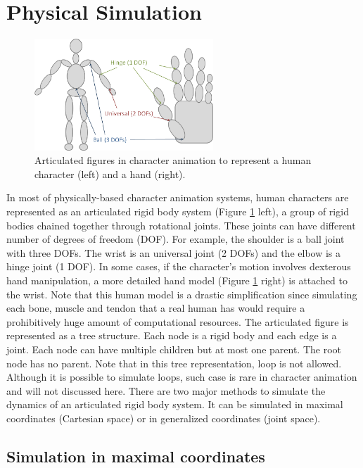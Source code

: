 \section{Physical Simulation}

\begin{figure}[h]
  \centering
  \includegraphics[width=0.6\textwidth]{figures/character}
  \caption{Articulated figures in character animation to represent a human character (left) and a hand (right).}
  \label{fig:character}
\end{figure}


In most of physically-based character animation systems, human characters are represented as an articulated rigid body system (Figure \ref{fig:character} left), a group of rigid bodies chained together through rotational joints. These joints can have different number of degrees of freedom (DOF). For example, the shoulder is a ball joint with three DOFs. The wrist is an universal joint (2 DOFs) and the elbow is a hinge joint (1 DOF). In some cases, if the character's motion involves dexterous hand manipulation, a more detailed hand model (Figure \ref{fig:character} right) is attached to the wrist. Note that this human model is a drastic simplification since simulating each bone, muscle and tendon that a real human has would require a prohibitively huge amount of computational resources. The articulated figure is represented as a tree structure. Each node is a rigid body and each edge is a joint. Each node can have multiple children but at most one parent. The root node has no parent. Note that in this tree representation, loop is not allowed. Although it is possible to simulate loops, such case is rare in character animation and will not discussed here. There are two major methods to simulate the dynamics of an articulated rigid body system. It can be simulated in maximal coordinates (Cartesian space) or in generalized coordinates (joint space).



\subsection{Simulation in maximal coordinates}

